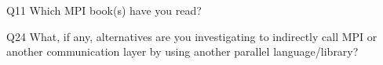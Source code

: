 \begin{description}%
\item{Q11} Which MPI book(s) have you read?%
\item{Q24} What, if any, alternatives are you investigating to indirectly call MPI or another communication layer by using another parallel language/library?%
\end{description}%
